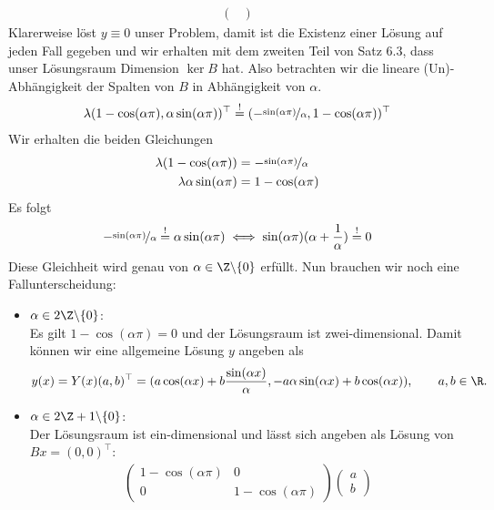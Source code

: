 \begin{solution}
\begin{enumerate}[label = \textbf{\alph*)}]
\begin{align*}
\begin{pmatrix}
    \end{pmatrix}
  \end{align*}
  Klarerweise löst $y \equiv 0$ unser Problem, damit ist die Existenz einer Lösung
  auf jeden Fall gegeben und wir erhalten mit dem zweiten Teil von Satz 6.3, dass
  unser Lösungsraum Dimension $\ker B$ hat. Also betrachten wir die lineare
  (Un)-Abhängigkeit der Spalten von $B$ in Abhängigkeit von $\alpha$.
  \begin{align*}
    \lambda(1 - \cos(\alpha \pi), \alpha\sin(\alpha \pi))^{\top} \stackrel{!}{=}
    (-\nicefrac{\sin(\alpha \pi)}{\alpha},1 - \cos(\alpha \pi))^{\top}
  \end{align*}
  Wir erhalten die beiden Gleichungen
  \begin{align*}
    \lambda(1 - \cos(\alpha \pi)) &= -\nicefrac{\sin(\alpha \pi)}{\alpha} \\
    \lambda\alpha\sin(\alpha \pi) &= 1 - \cos(\alpha \pi)
  \end{align*}
  Es folgt
  \begin{align*}
     -\nicefrac{\sin(\alpha \pi)}{\alpha} \stackrel{!}{=} \alpha\sin(\alpha \pi)
     \iff \sin(\alpha \pi)(\alpha + \frac{1}{\alpha}) \stackrel{!}{=} 0
  \end{align*}
  Diese Gleichheit wird genau von $\alpha \in \Z\backslash\{0\}$ erfüllt. Nun brauchen
  wir noch eine Fallunterscheidung:
  \begin{itemize}
    \item $\alpha \in 2\Z\backslash\{0\}$: \\
    Es gilt $1 - \cos(\alpha \pi) = 0$ und der Lösungsraum ist zwei-dimensional. Damit können wir eine allgemeine Lösung $y$
    angeben als
    \begin{align*}
      y(x) = Y(x)(a,b)^{\top} = (a\cos(\alpha x) + b\frac{\sin(\alpha x)}{\alpha}, -a\alpha\sin(\alpha x) + b\cos(\alpha x)), \qquad a,b \in \R.
    \end{align*}
    \item $\alpha \in 2\Z+1\backslash\{0\}$: \\
      Der Lösungsraum ist ein-dimensional und lässt sich angeben als
      Lösung von $Bx = (0,0)^{\top}$:
      \begin{align*}
        \begin{pmatrix}
          1 - \cos(\alpha \pi) & 0 \\
          0 & 1 - \cos(\alpha \pi)
        \end{pmatrix}
        \begin{pmatrix}
          a \\ b

\end{pmatrix}
\end{align*}
\end{itemize}
\end{enumerate}
\end{solution}
